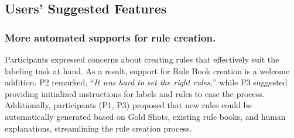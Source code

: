 







\subsection{Users' Suggested Features}

\subsubsection{More automated supports for rule creation.}
Participants expressed concerns about creating rules that effectively suit the labeling task at hand. As a result, support for Rule Book creation is a welcome addition.
P2 remarked, ``\textit{It was hard to set the right rules,}'' while P3 suggested providing initialized instructions for labels and rules to ease the process. Additionally, participants (P1, P3) proposed that new rules could be automatically generated based on Gold Shots, existing rule books, and human explanations, streamlining the rule creation process.

